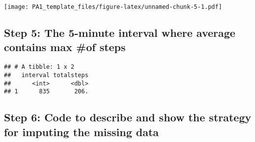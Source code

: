 \documentclass[]{article}
\newenvironment{Shaded}{\begin{snugshade}}{\end{snugshade}}
\newcommand{\CommentTok}[1]{\textcolor[rgb]{0.56,0.35,0.01}{\textit{#1}}}
\newcommand{\DataTypeTok}[1]{\textcolor[rgb]{0.13,0.29,0.53}{#1}}
\newcommand{\KeywordTok}[1]{\textcolor[rgb]{0.13,0.29,0.53}{\textbf{#1}}}
\newcommand{\NormalTok}[1]{#1}
\newcommand{\OperatorTok}[1]{\textcolor[rgb]{0.81,0.36,0.00}{\textbf{#1}}}
\newcommand{\StringTok}[1]{\textcolor[rgb]{0.31,0.60,0.02}{#1}}
\begin{document}
\begin{Shaded}
\end{Shaded}

\texttt{[image: PA1\_template\_files/figure-latex/unnamed-chunk-5-1.pdf]}

\hypertarget{step-5-the-5-minute-interval-where-average-contains-max-of-steps}{%
\subsection{Step 5: The 5-minute interval where average contains max
\#of
steps}\label{step-5-the-5-minute-interval-where-average-contains-max-of-steps}}

\begin{Shaded}
\end{Shaded}

\begin{verbatim}
## # A tibble: 1 x 2
##   interval totalsteps
##      <int>      <dbl>
## 1      835       206.
\end{verbatim}

\hypertarget{step-6-code-to-describe-and-show-the-strategy-for-imputing-the-missing-data}{%
\subsection{Step 6: Code to describe and show the strategy for imputing
the missing
data}\label{step-6-code-to-describe-and-show-the-strategy-for-imputing-the-missing-data}}
\end{document}
